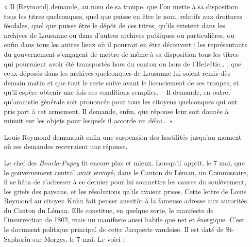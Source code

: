 \documentclass[french,twoside]{book} %
\newenvironment{quoteblock}%
  {\begin{quoting}}
  {\end{quoting}}
\newenvironment{quotebar}{%
    \def\FrameCommand{{\color{rubric!10!}\vrule width 0.5em} \hspace{0.9em}}%
    \def\OuterFrameSep{\itemsep} %
    \MakeFramed {\advance\hsize-\width \FrameRestore}
  }%
  {%
    \endMakeFramed
  }
\renewenvironment{quoteblock}%
  {%
    \savenotes
    \setstretch{0.9}
    \begin{quotebar}
  }
  {%
    \end{quotebar}
    \spewnotes
  }
\begin{document}
\begin{quoteblock}
 \noindent « Il [Reymond] demande, au nom de sa troupe, que l’on mette à sa disposition tous les titres quelconques, quel que puisse en être le nom, relatifs aux droitures féodales, quel que puisse être le dépôt de ces titres, qu’ils existent dans les archives de Lausanne ou dans d’autres archives publiques ou particulières, ou enfin dans tous les autres lieux où il pourrait en être découvert ; les représentants du gouvernement s’engagent de mettre de même à sa disposition tous les titres qui pourraient avoir été transportés hors du canton ou hors de l’Helvétie… ; que ceux déposés dans les archives quelconques de Lausanne lui soient remis dès demain matin et que tout le reste suive avant le licenciement de ses troupes, et qu’il espère obtenir une fois ces conditions remplies. – Il demande, en outre, qu’amnistie générale soit prononcée pour tous les citoyens quelconques qui ont pris part à cet armement. Il demande, enfin, que réponse leur soit donnée à minuit sur les objets pour lesquels il accorde un délai… »
 \end{quoteblock}

\noindent Louis Reymond demandait enfin une suspension des hostilités jusqu’au moment où ses demandes recevraient une réponse.\par
Le chef des \emph{Bourla-Papey} fit encore plus et mieux. Lorsqu’il apprit, le 7 mai, que le gouvernement central avait envoyé, dans le Canton du Léman, un Commissaire, il se hâta de s’adresser à ce dernier pour lui soumettre les causes du soulèvement, les griefs des paysans, et les résolutions qu’ils avaient prises. Cette lettre de Louis Reymond au citoyen Kuhn fait penser aussitôt à la fameuse adresse aux autorités du Canton du Léman. Elle constitue, en quelque sorte, le manifeste de l’insurrection de 1802, mais un manifeste aussi habile que net et énergique. C’est le document politique principal de cette Jacquerie vaudoise. Il est daté de St-Saphorin-sur-Morges, le 7 mai. Le voici :\par
\end{document}
